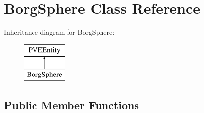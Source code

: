 \hypertarget{classBorgSphere}{
\section{BorgSphere Class Reference}
\label{d6/ddd/classBorgSphere}
}
Inheritance diagram for BorgSphere:\begin{figure}[H]
\begin{center}
\leavevmode
\includegraphics[height=2cm]{d6/ddd/classBorgSphere}
\end{center}
\end{figure}
\subsection*{Public Member Functions}
